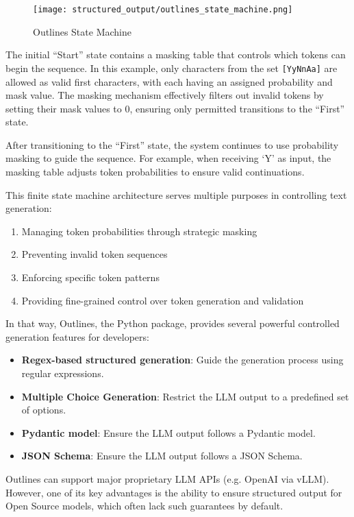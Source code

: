 \begin{figure*}[htbp]
\centering
\texttt{[image: structured\_output/outlines\_state\_machine.png]}
\caption{Outlines State Machine \cite{vivien2024regex}}
\label{fig:outlines-state-machine}
\end{figure*}

The initial ``Start'' state contains a masking table that controls which tokens can begin the sequence. In this example, only characters from the set \texttt{[YyNnAa]} are allowed as valid first characters, with each having an assigned probability and mask value. The masking mechanism effectively filters out invalid tokens by setting their mask values to 0, ensuring only permitted transitions to the ``First'' state.

After transitioning to the ``First'' state, the system continues to use probability masking to guide the sequence. For example, when receiving `Y' as input, the masking table adjusts token probabilities to ensure valid continuations.

This finite state machine architecture serves multiple purposes in controlling text generation:

\begin{enumerate}
    \item Managing token probabilities through strategic masking
    \item Preventing invalid token sequences 
    \item Enforcing specific token patterns
    \item Providing fine-grained control over token generation and validation
\end{enumerate}

In that way, Outlines, the Python package, provides several powerful controlled generation features for developers:
\begin{itemize}
    \item \textbf{Regex-based structured generation}: Guide the generation process using regular expressions.
    \item \textbf{Multiple Choice Generation}: Restrict the LLM output to a predefined set of options.
    \item \textbf{Pydantic model}: Ensure the LLM output follows a Pydantic model.
    \item \textbf{JSON Schema}: Ensure the LLM output follows a JSON Schema.
\end{itemize}

Outlines can support major proprietary LLM APIs (e.g. OpenAI via vLLM). However, one of its key advantages is the ability to ensure structured output for Open Source models, which often lack such guarantees by default.

